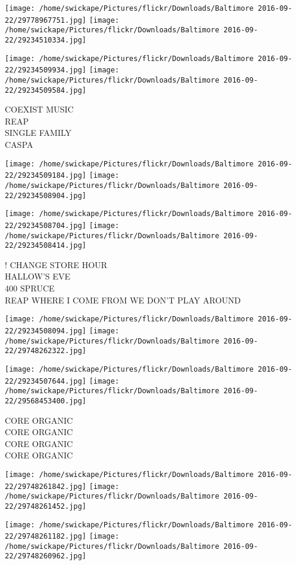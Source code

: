 \documentclass[10pt,letterpaper]{article}
\begin{document}
\texttt{[image: /home/swickape/Pictures/flickr/Downloads/Baltimore 2016-09-22/29778967751.jpg]}
\texttt{[image: /home/swickape/Pictures/flickr/Downloads/Baltimore 2016-09-22/29234510334.jpg]}

\texttt{[image: /home/swickape/Pictures/flickr/Downloads/Baltimore 2016-09-22/29234509934.jpg]}
\texttt{[image: /home/swickape/Pictures/flickr/Downloads/Baltimore 2016-09-22/29234509584.jpg]}

COEXIST MUSIC\\
REAP\\
SINGLE FAMILY\\
CASPA
\pagebreak

\texttt{[image: /home/swickape/Pictures/flickr/Downloads/Baltimore 2016-09-22/29234509184.jpg]}
\texttt{[image: /home/swickape/Pictures/flickr/Downloads/Baltimore 2016-09-22/29234508904.jpg]}

\texttt{[image: /home/swickape/Pictures/flickr/Downloads/Baltimore 2016-09-22/29234508704.jpg]}
\texttt{[image: /home/swickape/Pictures/flickr/Downloads/Baltimore 2016-09-22/29234508414.jpg]}

! CHANGE STORE HOUR\\
HALLOW'S EVE\\
400 SPRUCE\\
REAP WHERE I COME FROM WE DON'T PLAY AROUND
\pagebreak

\texttt{[image: /home/swickape/Pictures/flickr/Downloads/Baltimore 2016-09-22/29234508094.jpg]}
\texttt{[image: /home/swickape/Pictures/flickr/Downloads/Baltimore 2016-09-22/29748262322.jpg]}

\texttt{[image: /home/swickape/Pictures/flickr/Downloads/Baltimore 2016-09-22/29234507644.jpg]}
\texttt{[image: /home/swickape/Pictures/flickr/Downloads/Baltimore 2016-09-22/29568453400.jpg]}

CORE ORGANIC\\
CORE ORGANIC\\
CORE ORGANIC\\
CORE ORGANIC
\pagebreak

\texttt{[image: /home/swickape/Pictures/flickr/Downloads/Baltimore 2016-09-22/29748261842.jpg]}
\texttt{[image: /home/swickape/Pictures/flickr/Downloads/Baltimore 2016-09-22/29748261452.jpg]}

\texttt{[image: /home/swickape/Pictures/flickr/Downloads/Baltimore 2016-09-22/29748261182.jpg]}
\texttt{[image: /home/swickape/Pictures/flickr/Downloads/Baltimore 2016-09-22/29748260962.jpg]}
\end{document}
